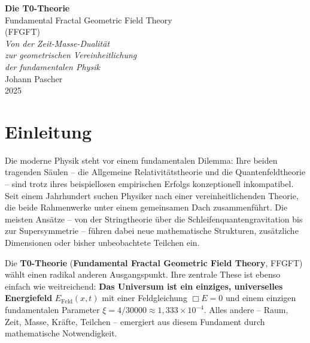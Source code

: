 \documentclass[11pt,oneside]{book}
\begin{document}
\frontmatter
\pagestyle{fancy}
\makeatletter
\let\ps@plain\ps@fancy
\let\ps@empty\ps@fancy
\makeatother

\begin{titlepage}
	\centering
	\vspace*{2cm}
	
	{\Huge\bfseries Die T0-Theorie}\\[0.8cm]
	{\LARGE Fundamental Fractal Geometric Field Theory}\\[0.5cm]
	{\LARGE (FFGFT)}\\[1.5cm]
	
	{\Large\itshape Von der Zeit-Masse-Dualität\\[0.3cm]
		zur geometrischen Vereinheitlichung\\[0.3cm]
		der fundamentalen Physik}\\[2cm]
	
	{\large Johann Pascher}\\[1cm]
	
	{\large 2025}
	
	\vfill
\end{titlepage}

\chapter*{Einleitung}

Die moderne Physik steht vor einem fundamentalen Dilemma: Ihre beiden tragenden Säulen -- die Allgemeine Relativitätstheorie und die Quantenfeldtheorie -- sind trotz ihres beispiellosen empirischen Erfolgs konzeptionell inkompatibel. Seit einem Jahrhundert suchen Physiker nach einer vereinheitlichenden Theorie, die beide Rahmenwerke unter einem gemeinsamen Dach zusammenführt. Die meisten Ansätze -- von der Stringtheorie über die Schleifenquantengravitation bis zur Supersymmetrie -- führen dabei neue mathematische Strukturen, zusätzliche Dimensionen oder bisher unbeobachtete Teilchen ein.

Die \textbf{T0-Theorie} (\textbf{Fundamental Fractal Geometric Field Theory}, FFGFT) wählt einen radikal anderen Ausgangspunkt. Ihre zentrale These ist ebenso einfach wie weitreichend: \textbf{Das Universum ist ein einziges, universelles Energiefeld} $E_{\text{Feld}}(x,t)$ mit einer Feldgleichung $\Box E = 0$ und einem einzigen fundamentalen Parameter $\xi = 4/30000 \approx 1{,}333 \times 10^{-4}$. Alles andere -- Raum, Zeit, Masse, Kräfte, Teilchen -- emergiert aus diesem Fundament durch mathematische Notwendigkeit.
\end{document}
